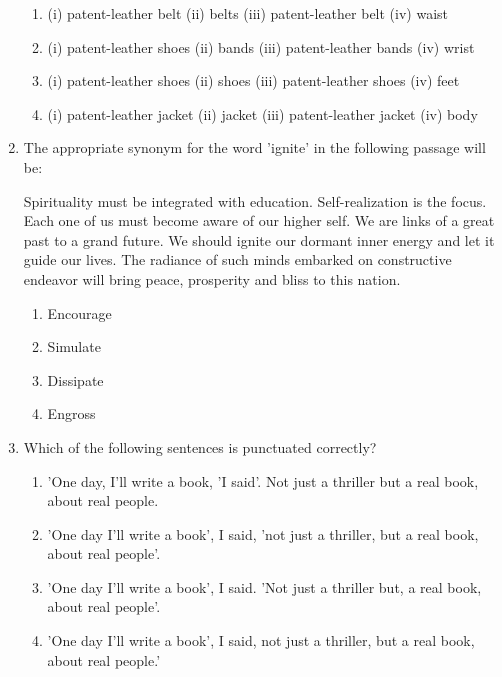 \documentclass[journal,12pt,onecolumn]{exam}
\theoremstyle{remark}
\begin{document}
\begin{enumerate}
    \begin{enumerate}[label=\alph*)]
        \item (i) patent-leather belt (ii) belts (iii) patent-leather belt (iv) waist
        \item (i) patent-leather shoes (ii) bands (iii) patent-leather bands (iv) wrist
        \item (i) patent-leather shoes (ii) shoes (iii) patent-leather shoes (iv) feet
        \item (i) patent-leather jacket (ii) jacket (iii) patent-leather jacket (iv) body
    \end{enumerate}
\newpage
\item The appropriate synonym for the word 'ignite' in the following passage will be:

    \medskip

    
    Spirituality must be integrated with education. Self-realization is the focus. Each one of us must become aware of our higher self. We are links of a great past to a grand future. We should ignite our dormant inner energy and let it guide our lives. The radiance of such minds embarked on constructive endeavor will bring peace, prosperity and bliss to this nation.

    \begin{enumerate}[label=\alph*)]
        \item Encourage
        \item Simulate
        \item Dissipate
        \item Engross
    \end{enumerate}

 \item Which of the following sentences is punctuated correctly?

    \begin{enumerate}[label=\alph*)]
        \item 'One day, I'll write a book, 'I said'. Not just a thriller but a real book, about real people.
        \item 'One day I'll write a book', I said, 'not just a thriller, but a real book, about real people'.
        \item 'One day I'll write a book', I said. 'Not just a thriller but, a real book, about real people'.
        \item 'One day I'll write a book', I said, not just a thriller, but a real book, about real people.'

    \end{enumerate}


\end{enumerate}
\end{document}
